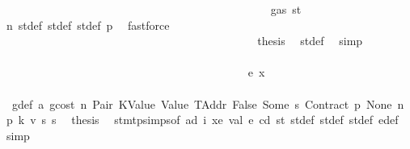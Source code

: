 \begin{isabellebody}
\ \ \ \ \ \ \ \ \ \ \ \ \ \ \ \ \ \ \ \ \ \ \ \ \ \ \ \ \ \ \ \ \ \ \ \ \ \ \ \ \ \ \ \ \isamarkupfalse%
\ {\isachardoublequoteopen}{\isasymdots}\ {\isasymle}\ gas\ st{\isacharprime}{\kern0pt}{\isachardoublequoteclose}\ \isamarkupfalse%
\ n\ st{\isacharprime}{\kern0pt}{\isacharunderscore}{\kern0pt}def\ st{\isacharprime}{\kern0pt}{\isacharprime}{\kern0pt}{\isacharunderscore}{\kern0pt}def\ st{\isacharprime}{\kern0pt}{\isacharprime}{\kern0pt}{\isacharprime}{\kern0pt}{\isacharunderscore}{\kern0pt}def\ p{}\ \isamarkupfalse%
\ fastforce\isanewline
\ \ \ \ \ \ \ \ \ \ \ \ \ \ \ \ \ \ \ \ \ \ \ \ \ \ \ \ \ \ \ \ \ \ \ \ \ \ \ \ \ \ \isamarkupfalse%
\ \isamarkupfalse%
\ {\isacharquery}{\kern0pt}thesis\ \isamarkupfalse%
\ st{\isacharprime}{\kern0pt}{\isacharunderscore}{\kern0pt}def\ \isamarkupfalse%
\ simp\isanewline
\ \ \ \ \ \ \ \ \ \ \ \ \ \ \ \ \ \ \ \ \ \ \ \ \ \ \ \ \ \ \ \ \ \ \ \ \ \ \ \ \isamarkupfalse%
\isanewline
\ \ \ \ \ \ \ \ \ \ \ \ \ \ \ \ \ \ \ \ \ \ \ \ \ \ \ \ \ \ \ \ \ \ \ \ \ \ \ \ \ \ \isamarkupfalse%
\ {\isacharparenleft}{\kern0pt}e\ x{\isacharparenright}{\kern0pt}\isanewline
\ \ \ \ \ \ \ \ \ \ \ \ \ \ \ \ \ \ \ \ \ \ \ \ \ \ \ \ \ \ \ \ \ \ \ \ \ \ \ \ \ \ \isamarkupfalse%
\ {}{\isacharparenleft}{\kern0pt}{}{\isacharparenright}{\kern0pt}\ g{\isacharunderscore}{\kern0pt}def\ a{}\ gcost\ n\ Pair\ KValue\ Value\ TAddr\ False\ Some\ s{}\ Contract\ p{}\ None\ n{}\ p{}\ k{}\ v\ s{}\ s{}\ \isamarkupfalse%
\ {\isacharquery}{\kern0pt}thesis\ \isamarkupfalse%
\ stmt{\isachardot}{\kern0pt}psimps{\isacharparenleft}{\kern0pt}{}{\isacharparenright}{\kern0pt}{\isacharbrackleft}{\kern0pt}of\ ad\ i\ xe\ val\ e\ cd\ st{\isacharbrackright}{\kern0pt}\ st{\isacharprime}{\kern0pt}{\isacharunderscore}{\kern0pt}def\ st{\isacharprime}{\kern0pt}{\isacharprime}{\kern0pt}{\isacharunderscore}{\kern0pt}def\ st{\isacharprime}{\kern0pt}{\isacharprime}{\kern0pt}{\isacharprime}{\kern0pt}{\isacharunderscore}{\kern0pt}def\ e{\isacharprime}{\kern0pt}{\isacharunderscore}{\kern0pt}def\ \isamarkupfalse%
\ simp\isanewline
\ \ \ \ \ \ \ \ \ \ \ \ \ \ \ \ \ \ \ \ \ \ \ \ \ \ \ \ \ \ \ \ \ \ \ \ \ \ \ \ \isamarkupfalse%
\isanewline
\ \ \ \ \ \ \ \ \ \ \ \ \ \ \ \ \ \ \ \ \ \ \ \ \ \ \ \ \ \ \ \ \ \ \ \ \ \ \isamarkupfalse%

\end{isabellebody}
